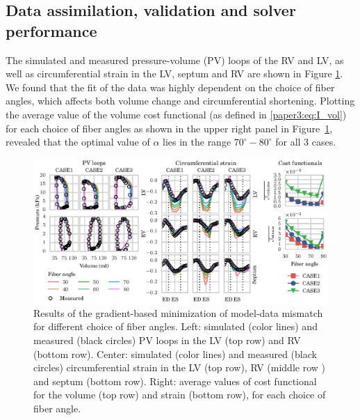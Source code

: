 \subsection{Data assimilation, validation and solver performance}
\label{paper3:sec:data_asssim}
\label{paper3:sec:validation}
\label{paper3:sec:sys_perform}
The simulated and measured pressure-volume (PV) loops of the RV and LV, as well as circumferential strain in the LV, septum
and RV are shown in Figure \ref{paper3:fig:data_matching}. We found that the fit of the data was highly dependent
on the choice of fiber angles, which affects both volume change and circumferential shortening. Plotting the average value of the
volume cost functional (as defined in \eqref{paper3:eq:I_vol}) for each
choice of fiber angles as shown in the upper right panel in
Figure~\ref{paper3:fig:data_matching}, revealed that the optimal value of
$\alpha$ lies in the range $70^{\circ}-80^{\circ}$ for all 3 cases.


\begin{figure}[htbp]
 \centering
  \includegraphics[width=\textwidth]{figures/data_matching}
  \caption{\label{paper3:fig:data_matching}Results of the gradient-based
    minimization of model-data mismatch for different choice of fiber
    angles. Left: simulated (color lines) and measured (black circles)
    PV loops in the LV (top row) and RV (bottom row). Center:
    simulated (color lines) and measured (black circles)
    circumferential strain in the LV (top row), RV (middle row ) and
    septum (bottom row). Right: average values of cost functional for
    the volume (top row) and strain (bottom row), for each choice of
    fiber angle.}  
\end{figure}


